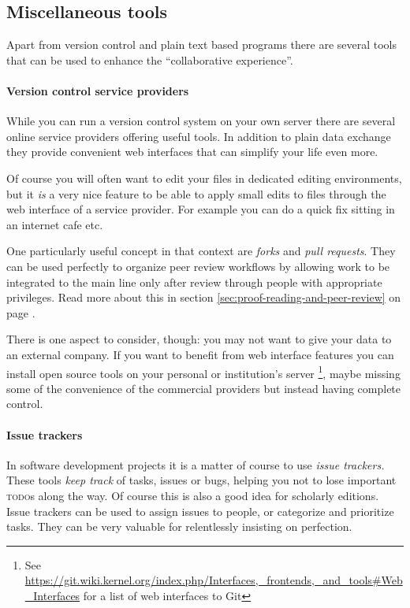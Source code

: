 \documentclass[11pt,a4paper]{article}
\begin{document}
\subsection{Miscellaneous tools}
Apart from version control and plain text based programs there are several tools that
can be used to enhance the “collaborative experience”.

\paragraph{Version control service providers}
While you can run a version control system on your own server there are several online service providers offering useful tools. In addition to plain data exchange they
provide convenient web interfaces that can simplify your life even more.

Of course you will often want to edit your files in dedicated editing environments, but
it \emph{is} a very nice feature to be able to apply small edits to files through the web 
interface of a service provider. For example you can do a quick fix sitting in an internet
cafe etc.

One particularly useful concept in that context are \emph{forks} and \emph{pull requests}.
They can be used perfectly to organize peer review workflows by allowing work to be
integrated to the main line only after review through people with appropriate privileges.
Read more about this in section \ref{sec:proof-reading-and-peer-review} on page \pageref{sec:proof-reading-and-peer-review}.

There is one aspect to consider, though: you may not want to give your data to an external
company. If you want to benefit from web interface features you can install open source
tools on your personal or institution's server%
\footnote{See \url{https://git.wiki.kernel.org/index.php/Interfaces,\_frontends,\_and\_tools\#Web\_Interfaces} for a list of web interfaces to Git},
maybe missing some of the convenience of the commercial providers but instead having complete
control.

\paragraph{Issue trackers}
In software development projects it is a matter of course to use \emph{issue trackers.}
These tools \emph{keep track} of tasks, issues or bugs, helping you not to lose important
\textsc{todo}s along the way. Of course this is also a good idea for scholarly editions. Issue
trackers can be used to assign issues to people, or categorize and prioritize tasks.
They can be very valuable for relentlessly insisting on perfection.
\end{document}

